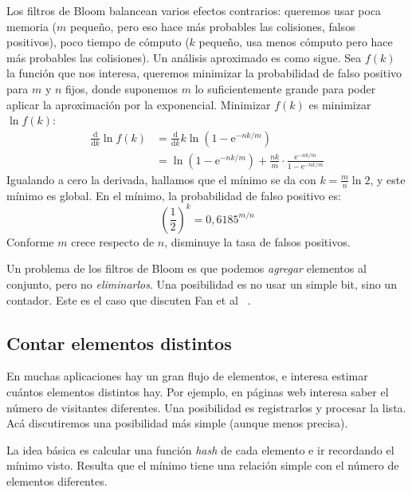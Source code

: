   Los filtros de Bloom balancean varios efectos contrarios:
  queremos usar poca memoria
  (\(m\) pequeño,
   pero eso hace más probables las colisiones,
   falsos positivos),
  poco tiempo de cómputo
  (\(k\) pequeño,
   usa menos cómputo pero hace más probables las colisiones).
  Un análisis aproximado es como sigue.
  Sea \(f(k)\) la función que nos interesa,
  queremos minimizar
  la probabilidad de falso positivo para \(m\) y \(n\) fijos,
  donde suponemos \(m\) lo suficientemente grande
  para poder aplicar la aproximación por la exponencial.
  Minimizar \(f(k)\) es minimizar \(\ln f(k)\):
  \begin{align*}
    \frac{\mathrm{d}}{\mathrm{d} k} \ln f(k)
      &= \frac{\mathrm{d}}{\mathrm{d} k}
           k \ln \left( 1 - \mathrm{e}^{- n k / m} \right) \\
      &= \ln \left( 1 - \mathrm{e}^{- n k / m} \right)
           + \frac{n k}{m}
               \cdot \frac{\mathrm{e}^{- n k / m}}
                          {1 - \mathrm{e}^{- n k / m}}
  \end{align*}
  Igualando a cero la derivada,
  hallamos que el mínimo se da con \(k = \frac{m}{n} \ln 2\),
  y este mínimo es global.
  En el mínimo,
  la probabilidad de falso positivo es:
  \begin{equation*}
    \left( \frac{1}{2} \right)^k
      = 0,6185^{m/n}
  \end{equation*}
  Conforme \(m\) crece respecto de \(n\),
  disminuye la tasa de falsos positivos.

  Un problema de los filtros de Bloom
  es que podemos \emph{agregar} elementos al conjunto,
  pero no \emph{eliminarlos}.
  Una posibilidad es no usar un simple bit,
  sino un contador.
  Este es el caso que discuten Fan et al~%
    \cite{fan00:_summary_cache}.

\subsection{Contar elementos distintos}
\label{sec:contar-distintos}

  En muchas aplicaciones hay un gran flujo de elementos,
  e interesa estimar cuántos elementos distintos hay.
  Por ejemplo,
  en páginas web interesa saber el número de visitantes diferentes.
  Una posibilidad es registrarlos y procesar la lista.
  Acá discutiremos una posibilidad más simple
  (aunque menos precisa).

  La idea básica es calcular una función \emph{\foreignlanguage{english}{hash}}
  de cada elemento e ir recordando el mínimo visto.
  Resulta que el mínimo tiene una relación simple
  con el número de elementos diferentes.


